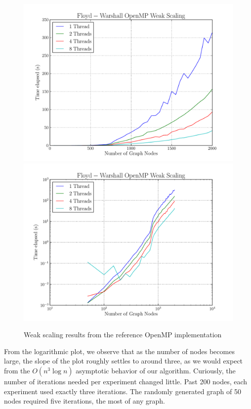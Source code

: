 \documentclass[12pt]{article}
\begin{document}
\begin{figure}
  \centering
  \includegraphics[scale=0.7]{../profiling/omp_linear_weak.pdf}
  \includegraphics[scale=0.7]{../profiling/omp_log_weak.pdf}
  \caption{Weak scaling results from the reference OpenMP implementation}
\end{figure}

From the logarithmic plot, we observe that as the number of nodes
becomes large, the slope of the plot roughly settles to around three,
as we would expect from the $O(n^3 \log n)$ asymptotic behavior of our
algorithm. Curiously, the number of iterations needed per experiment
changed little. Past 200 nodes, each experiment used exactly three
iterations. The randomly generated graph of 50 nodes required five
iterations, the most of any graph.
\end{document}
